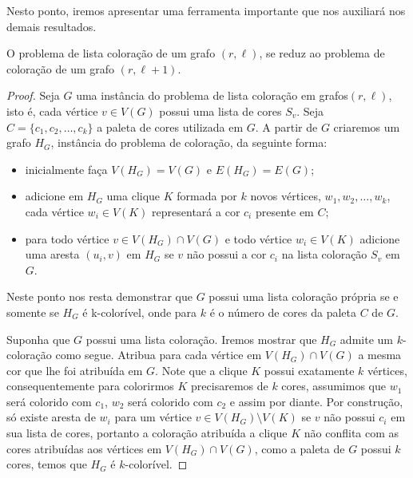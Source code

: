 Nesto ponto, iremos apresentar uma ferramenta importante que nos auxiliará nos demais resultados.
 
\begin{teorema}
\label{theorem:list-coloring}
O problema de lista coloração de um grafo $(r,\ell)$, se reduz ao problema de coloração de um grafo $(r,\ell+1)$.
\end{teorema}

\begin{proof}
Seja $G$ uma instância do problema de lista coloração em grafos$(r,\ell)$, isto é, cada vértice $v \in V(G)$ possui uma lista de cores $S_v$. Seja $C=\{c_1,c_2,\ldots,c_k\}$ a paleta de cores utilizada em $G$. A  partir de $G$ criaremos um grafo $H_G$, instância do problema de coloração, da seguinte forma:

\begin{itemize}
\item inicialmente faça $V(H_G)=V(G)$ e $E(H_G)=E(G)$;
\item adicione em $H_G$ uma clique $K$ formada por $k$ novos vértices, $w_1,w_2,\ldots,w_k$, cada vértice $w_i \in V(K)$ representará a cor $c_i$ presente em $C$;
\item para todo vértice $v \in V(H_G)\cap V(G)$ e todo vértice $w_i \in V(K)$ adicione uma aresta $(u_i,v)$ em $H_G$ se $v$ não possui a cor $c_i$ na lista coloração $S_v$ em $G$.
\end{itemize}

Neste ponto nos resta demonstrar que $G$ possui uma lista coloração própria se e somente se $H_G$ é k-colorível, onde para $k$ é o número de cores da paleta $C$ de $G$.
	

Suponha que $G$ possui uma lista coloração. Iremos mostrar que $H_G$ admite um $k$-coloração como segue. Atribua para cada vértice em $V(H_G)\cap V(G)$ a mesma cor que lhe foi atribuída em $G$. Note que a clique $K$ possui exatamente $k$ vértices, consequentemente para colorirmos $K$ precisaremos de $k$ cores, assumimos que $w_1$ será colorido com $c_1$, $w_2$ será colorido com $c_2$ e assim por diante. Por construção, só existe aresta de $w_i$ para um vértice $v \in V(H_G)\setminus V(K)$ se $v$ não possui $c_i$ em sua lista de cores, portanto a coloração atribuída a clique $K$ não conflita com as cores atribuídas aos vértices em $V(H_G)\cap V(G)$, como a paleta de $G$ possui $k$ cores, temos que $H_G$ é $k$-colorível.
	


\end{proof}
